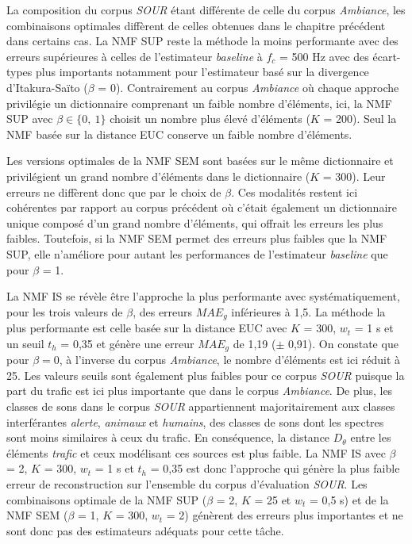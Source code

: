 La composition du corpus \textit{SOUR} étant différente de celle du corpus \textit{Ambiance}, les combinaisons optimales diffèrent de celles obtenues dans le chapitre précédent dans certains cas.
La NMF SUP reste la méthode la moins performante avec des erreurs supérieures à celles de l'estimateur \textit{baseline} à $f_c$ = 500 Hz avec des écart-types plus importants notamment pour l'estimateur basé sur la divergence d'Itakura-Saïto ($\beta$ = 0). Contrairement au corpus \textit{Ambiance} où chaque approche privilégie un dictionnaire comprenant un faible nombre d'éléments, ici, la NMF SUP avec $\beta \in \lbrace 0,~1 \rbrace$ choisit un nombre plus élevé d'éléments ($K$ = 200). Seul la NMF basée sur la distance EUC conserve un faible nombre d'éléments.

Les versions optimales de la NMF SEM sont basées sur le même dictionnaire et privilégient un grand nombre d'éléments dans le dictionnaire ($K$ = 300). Leur erreurs ne diffèrent donc que par le choix de $\beta$. Ces modalités restent ici cohérentes par rapport au corpus précédent où c'était également un dictionnaire unique composé d'un grand nombre d'éléments, qui offrait les erreurs les plus faibles.  Toutefois, si la NMF SEM permet des erreurs plus faibles que la NMF SUP, elle n'améliore pour autant  les performances de l'estimateur \textit{baseline} que pour $\beta$ = 1.  

La NMF IS se révèle être l'approche la plus performante avec systématiquement, pour les trois valeurs de $\beta$, des erreurs $MAE_g$ inférieures à 1,5. La méthode la plus performante est celle basée sur la distance EUC avec $K$ = 300, $w_t$ = 1 s et un seuil $t_h$ = 0,35 et génère une erreur $MAE_g$ de 1,19 ($\pm$ 0,91). On constate que pour $\beta = 0$, à l'inverse du corpus \textit{Ambiance}, le nombre d'éléments est ici réduit à 25. 
Les valeurs seuils sont également plus faibles pour ce corpus \textit{SOUR} puisque la part du trafic est ici plus importante que dans le corpus \textit{Ambiance}. De plus, les classes de sons dans le corpus \textit{SOUR} appartiennent majoritairement aux classes interférantes \textit{alerte}, \textit{animaux} et \textit{humains}, des classes de sons dont les spectres sont moins similaires à ceux du trafic. En conséquence, la distance $D_{\theta}$ entre les éléments \textit{trafic} et ceux modélisant ces sources est plus faible. 
La NMF IS avec $\beta$ = 2, $K$ = 300, $w_t$ = 1 s et $t_h$ = 0,35 est donc l'approche qui génère la plus faible erreur de reconstruction sur l'ensemble du corpus d'évaluation \textit{SOUR}. Les combinaisons optimale de la NMF SUP ($\beta$ = 2, $K$ = 25 et $w_t$ = 0,5 s) et de la NMF SEM ($\beta$ = 1, $K$ = 300, $w_t$ = 2) génèrent des erreurs plus importantes et ne sont donc pas des estimateurs adéquats pour cette tâche.

